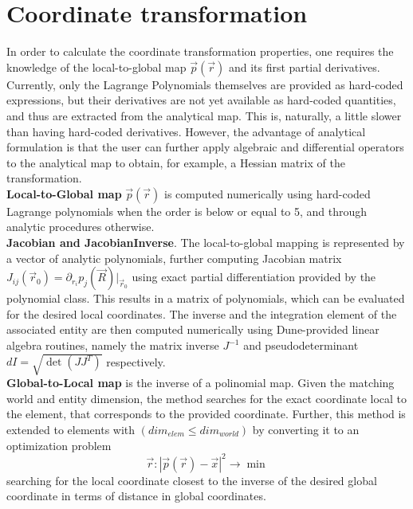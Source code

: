 \section{Coordinate transformation}

In order to calculate the coordinate transformation properties, one requires the knowledge of the local-to-global map $\vec{p}(\vec{r})$ and its first partial derivatives. Currently, only the Lagrange Polynomials themselves are provided as hard-coded expressions, but their derivatives are not yet available as hard-coded quantities, and thus are extracted from the analytical map. This is, naturally, a little slower than having hard-coded derivatives. However, the advantage of analytical formulation is that the user can further apply algebraic and differential operators to the analytical map to obtain, for example, a Hessian matrix of the transformation.  \\

\noindent
\textbf{Local-to-Global map} $\vec{p}(\vec{r})$ is computed numerically using hard-coded Lagrange polynomials when the order is below or equal to 5, and through analytic procedures otherwise. \\

\noindent
\textbf{Jacobian and JacobianInverse}.
The local-to-global mapping is represented by a vector of analytic polynomials, further computing Jacobian matrix $J_{ij}(\vec{r}_0) = \partial_{r_i} p_j (\vec{R}) |_{\vec{r}_0}$ using exact partial differentiation provided by the polynomial class. This results in a matrix of polynomials, which can be evaluated for the desired local coordinates. The inverse and the integration element of the associated entity are then computed numerically using Dune-provided linear algebra routines, namely the matrix inverse $J^{-1}$ and pseudodeterminant $dI = \sqrt{\det(JJ^T)}$ respectively. \\

\noindent
\textbf{Global-to-Local map} is the inverse of a polinomial map. Given the matching world and entity dimension, the method searches for the exact coordinate local to the element, that corresponds to the provided coordinate. Further, this method is extended to elements with $(dim_{elem} \leq dim_{world})$ by converting it to an optimization problem
\begin{equation}
  \label{eq-theory-mapping-optimization}
  \vec{r} : |\vec{p}(\vec{r}) - \vec{x} |^2 \rightarrow \min
\end{equation} 
searching for the local coordinate closest to the inverse of the desired global coordinate in terms of distance in global coordinates. \\

